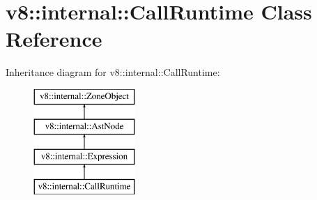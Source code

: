\hypertarget{classv8_1_1internal_1_1_call_runtime}{}\section{v8\+:\+:internal\+:\+:Call\+Runtime Class Reference}
\label{classv8_1_1internal_1_1_call_runtime}
Inheritance diagram for v8\+:\+:internal\+:\+:Call\+Runtime\+:\begin{figure}[H]
\begin{center}
\leavevmode
\includegraphics[height=4.000000cm]{classv8_1_1internal_1_1_call_runtime}
\end{center}
\end{figure}

